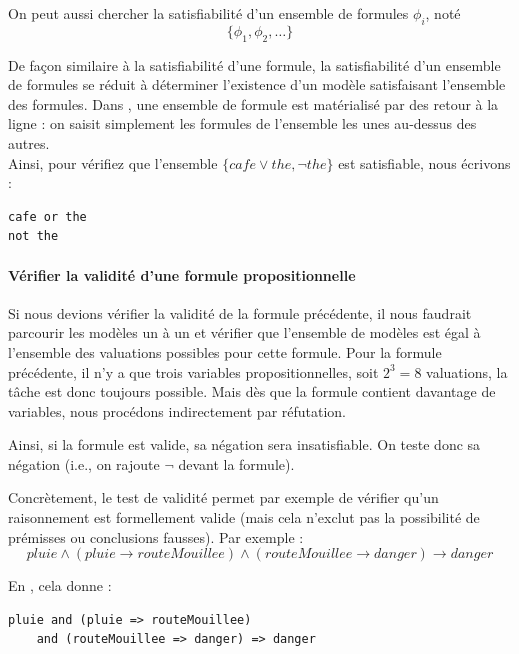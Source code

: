 On peut aussi chercher la satisfiabilité d'un ensemble de formules $\phi_i$, noté \[\{\phi_1, \phi_2, \dots\}\]

\noindent
De façon similaire à la satisfiabilité d'une formule, la satisfiabilité d'un ensemble de formules se réduit à déterminer l'existence d'un modèle satisfaisant l'ensemble des formules. Dans \touist, une ensemble de formule est matérialisé par des retour à la ligne : on saisit simplement les formules de l'ensemble les unes au-dessus des autres.\\%
Ainsi, pour vérifiez que l'ensemble $\{\mathit{cafe\vee the, \neg the}\}$ est satisfiable, nous écrivons :

\begin{lstlisting}
cafe or the
not the
\end{lstlisting}


\paragraph{Vérifier la validité d'une formule propositionnelle}

Si nous devions vérifier la validité de la formule précédente, il nous faudrait parcourir les modèles un à un et vérifier que l'ensemble de modèles est égal à l'ensemble des valuations possibles pour cette formule. Pour la formule précédente, il n'y a que trois variables propositionnelles, soit $2^3 = 8$ valuations, la tâche est donc toujours possible. Mais dès que la formule contient davantage de variables, nous procédons  indirectement par réfutation.

\noindent
Ainsi, si la formule est valide, sa négation sera insatisfiable. On teste donc sa négation (i.e., on rajoute $\neg$ devant la formule).

Concrètement, le test de validité permet par exemple de vérifier qu'un raisonnement est formellement valide (mais cela n'exclut pas la possibilité de prémisses ou conclusions fausses). Par exemple :
\[pluie \wedge (pluie \rightarrow routeMouillee) \wedge (routeMouillee \rightarrow danger) \rightarrow danger\]

\noindent En \touist, cela donne :

\begin{lstlisting}[language=touist, frame=single]
pluie and (pluie => routeMouillee)
    and (routeMouillee => danger) => danger
\end{lstlisting}



